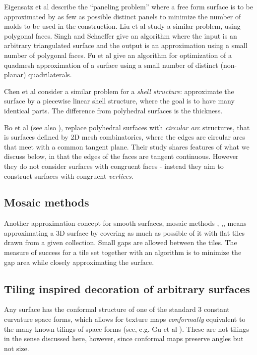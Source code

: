 \documentclass[11pt]{amsart}
\theoremstyle{remark}
\begin{document}
Eigensatz et al \cite{eigensatz2010paneling} describe the ``paneling problem'' where a free form surface is to be approximated by as few as possible distinct panels to minimize the number of molds to be used in the construction.
Liu et al \cite{liu2023reducing} study a similar problem, using polygonal faces.
Singh  and Schaeffer \cite{singh2010triangle} give an algorithm where the input is an arbitrary triangulated surface and the output is an approximation using a small number of polygonal faces. Fu et al \cite{fu2010k} give an algorithm for optimization of a quadmesh approximation of a surface using a small number of distinct (non-planar) quadrilaterals.

Chen et al \cite{chen2023masonry} consider a similar problem for a \emph{shell structure}: approximate the surface by a piecewise linear shell structure, where the goal is to have many identical parts. The difference from polyhedral surfaces is the thickness.  

Bo et al \cite{bo2011circular} (see also \cite{bartovn2013circular}), replace polyhedral surfaces with \emph{circular arc} structures, that is surfaces defined by 2D mesh combinatorics,  where the edges are circular arcs that meet with a common tangent plane.     
Their study shares features of what we discuss below, in that the edges of the faces are tangent continuous. However they do not consider surfaces with congruent faces - instead they aim to construct surfaces with congruent \emph{vertices}.

\subsection{Mosaic methods}
Another approximation concept for smooth surfaces,  mosaic methods  \cite{PW2008}, \cite{PW2009} \cite{chen2017fabricable},\cite{hu2015surface}, 
means approximating a 3D surface by covering as much as possible of it with
flat tiles drawn from a given collection.  Small gaps are allowed between the tiles.  The measure of success for a tile set together with an algorithm is to minimize the gap area while closely approximating the surface.


\subsection{Tiling inspired decoration of arbitrary surfaces}
Any surface has the conformal structure of one of the standard 3 constant curvature
space forms, which allows for texture maps \emph{conformally} equivalent to the many known tilings
of space forms (see, e.g. Gu et al \cite{gu2010fundamentals}). These are not tilings in the sense
discussed here, however, since conformal maps preserve angles but not size.
\end{document}
